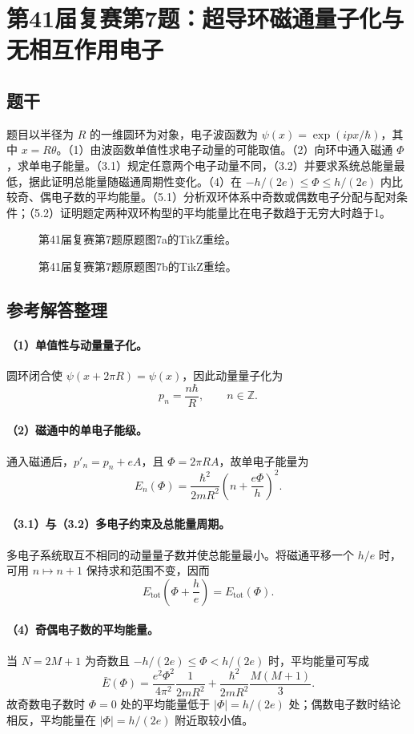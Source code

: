 \section{第41届复赛第7题：超导环磁通量子化与无相互作用电子}
\subsection{题干}
题目以半径为 $R$ 的一维圆环为对象，电子波函数为 $\psi(x)=\exp(ipx/\hbar)$，其中 $x=R\theta$。（1）由波函数单值性求电子动量的可能取值。（2）向环中通入磁通 $\Phi$，求单电子能量。（3.1）规定任意两个电子动量不同，（3.2）并要求系统总能量最低，据此证明总能量随磁通周期性变化。（4）在 $-h/(2e)\leq\Phi\leq h/(2e)$ 内比较奇、偶电子数的平均能量。（5.1）分析双环体系中奇数或偶数电子分配与配对条件；（5.2）证明题定两种双环构型的平均能量比在电子数趋于无穷大时趋于1。
\begin{figure}[htbp]\centering\caption{第41届复赛第7题原题图7a的TikZ重绘。}\end{figure}
\begin{figure}[htbp]\centering\caption{第41届复赛第7题原题图7b的TikZ重绘。}\end{figure}
\subsection{参考解答整理}
\paragraph{（1）单值性与动量量子化。}
圆环闭合使 $\psi(x+2\pi R)=\psi(x)$，因此动量量子化为
\[p_n=\frac{n\hbar}{R},\qquad n\in\mathbb Z.\]
\paragraph{（2）磁通中的单电子能级。}
通入磁通后，$p'_n=p_n+eA$，且 $\Phi=2\pi RA$，故单电子能量为
\[E_n(\Phi)=\frac{\hbar^2}{2mR^2}\left(n+\frac{e\Phi}{h}\right)^2.\]
\paragraph{（3.1）与（3.2）多电子约束及总能量周期。}
多电子系统取互不相同的动量量子数并使总能量最小。将磁通平移一个 $h/e$ 时，可用 $n\mapsto n+1$ 保持求和范围不变，因而
\[E_{\mathrm{tot}}\left(\Phi+\frac{h}{e}\right)=E_{\mathrm{tot}}(\Phi).\]
\paragraph{（4）奇偶电子数的平均能量。}
当 $N=2M+1$ 为奇数且 $-h/(2e)\leq\Phi<h/(2e)$ 时，平均能量可写成
\[\bar E(\Phi)=\frac{e^2\Phi^2}{4\pi^2}\frac{1}{2mR^2}+\frac{\hbar^2}{2mR^2}\frac{M(M+1)}{3}.\]
故奇数电子数时 $\Phi=0$ 处的平均能量低于 $|\Phi|=h/(2e)$ 处；偶数电子数时结论相反，平均能量在 $|\Phi|=h/(2e)$ 附近取较小值。

